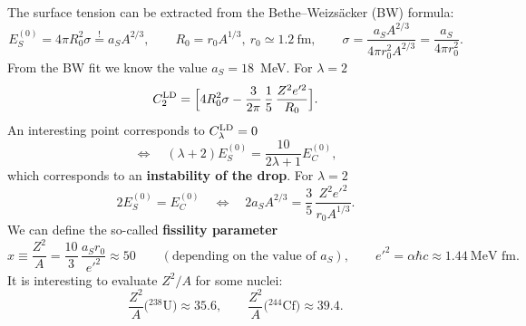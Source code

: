 \documentclass[11pt,a4paper]{article}
\begin{document}
The surface tension can be extracted from the Bethe--Weizs\"acker (BW) formula:
\[
E_S^{(0)}=4\pi R_0^2\sigma\overset{!}{=}a_SA^{2/3},\qquad R_0=r_0A^{1/3},\ r_0\simeq1.2\ \text{fm},
\qquad
\sigma=\frac{a_SA^{2/3}}{4\pi r_0^2A^{2/3}}=\frac{a_S}{4\pi r_0^2}.
\]
From the BW fit we know the value $a_S=18$~MeV. For $\lambda=2$
\[
C_2^{\rm LD}=\Big[4R_0^2\sigma-\frac{3}{2\pi}\,\frac15\,\frac{Z^2e'^2}{R_0}\Big].
\]
An interesting point corresponds to $C_\lambda^{\rm LD}=0$
\[
\Longleftrightarrow\quad(\lambda+2)E_S^{(0)}=\frac{10}{2\lambda+1}E_C^{(0)},
\]
which corresponds to an \textbf{instability of the drop}. For $\lambda=2$
\[
2E_S^{(0)}=E_C^{(0)}\quad\Longleftrightarrow\quad 2a_SA^{2/3}=\frac35\,\frac{Z^2e'^2}{r_0A^{1/3}} .
\]
We can define the so-called \textbf{fissility parameter}
\[
x\equiv\frac{Z^2}{A}=\frac{10}{3}\,\frac{a_Sr_0}{e'^2}\approx50
\qquad(\text{depending on the value of }a_S),
\qquad e'^2=\alpha\hbar c\approx1.44\ \text{MeV fm}.
\]
It is interesting to evaluate $Z^2/A$ for some nuclei:
\[
\frac{Z^2}{A}\big({}^{238}\text{U}\big)\approx35.6,\qquad \frac{Z^2}{A}\big({}^{244}\text{Cf}\big)\approx39.4 .
\]
\end{document}

